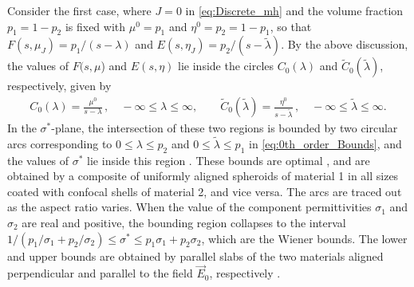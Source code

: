 \documentclass{cmslatex}
\begin{document}
Consider the first case, where $J=0$  in \eqref{eq:Discrete_mh} and the
volume fraction $p_1=1-p_2$ is fixed with $\mu^0=p_1$ and
$\eta^0=p_2=1-p_1$, so that $F(s,\mu_J)=p_1/(s-\lambda)$ and
$E(s,\eta_J)=p_2/(s-\tilde{\lambda})$. By the above discussion, the values of 
$F(s,\mu$) and $E(s,\eta)$ lie inside the circles $C_0(\lambda)$ and
$\tilde{C}_0(\tilde{\lambda})$, respectively, given by  
%
\begin{align}\label{eq:0th_order_Bounds}
    C_0(\lambda)=\frac{\mu^0}{s-\lambda}\,, \quad -\infty\leq\lambda\leq \infty, \qquad
    \tilde{C}_0(\tilde{\lambda})=\frac{\eta^0}{s-\tilde{\lambda}}\,, \quad
    -\infty\leq\tilde{\lambda}\leq \infty. 
\end{align}
%
In the $\sigma^*$-plane, the intersection of these two regions is bounded by
two circular arcs corresponding to $0\leq\lambda\leq p_2$ and $0\leq\tilde{\lambda}\leq p_1$
in \eqref{eq:0th_order_Bounds}, and the values of $\sigma^*$ lie inside
this region \cite{Golden:1986:BCP}. These bounds are optimal
\cite{Milton:JAP-5286,Bergman:AP-78}, and are obtained by a composite
of uniformly aligned spheroids of material 1 in all sizes coated with
confocal shells of material 2, and vice versa. The arcs are traced out
as the aspect ratio varies. When the value of the component
permittivities $\sigma_1$ and $\sigma_2$ are real and positive, the bounding
region collapses to the interval
$1/(p_1/\sigma_1+p_2/\sigma_2)\leq\sigma^*\leq p_1\sigma_1+p_2\sigma_2$, which are the Wiener
bounds. The lower and upper bounds are obtained by parallel slabs of
the two materials aligned perpendicular and parallel to the field
$\vec{E}_0$, respectively \cite{Scaife-1989}.
\end{document}
